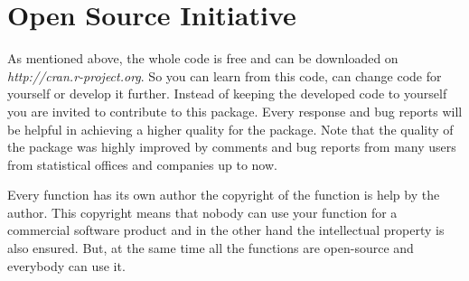 \documentclass[12pt]{article}
\begin{document}
\section{Open Source Initiative}

As mentioned above, the whole code is free and can be downloaded on {\it http://cran.r-project.org}. So you can learn from this code, can change code for yourself or develop it further. Instead of keeping the developed code to yourself you are invited to contribute to this package. 
Every response and bug reports will be helpful in achieving a higher quality for the package. Note that the quality of the package was highly improved by comments and bug reports from many users from statistical offices and companies up to now. 

Every function has its own author the copyright of the function is help by the author. This copyright means that nobody can use your function for a commercial software product and in the other hand the intellectual property is also ensured. But, at the same time all the functions are open-source and everybody can use it. 





\end{document}
